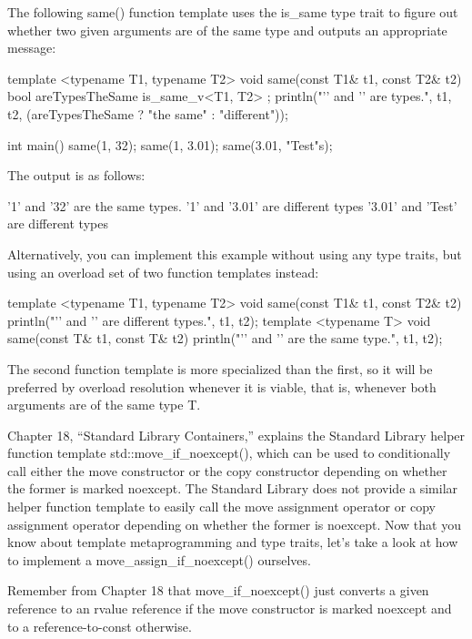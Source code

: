 The following same() function template uses the is\_same type trait to figure out whether two given arguments are of the same type and outputs an appropriate message:

\begin{cpp}
template <typename T1, typename T2>
void same(const T1& t1, const T2& t2)
{
    bool areTypesTheSame { is_same_v<T1, T2> };
    println("'{}' and '{}' are {} types.", t1, t2,
    (areTypesTheSame ? "the same" : "different"));
}

int main()
{
    same(1, 32);
    same(1, 3.01);
    same(3.01, "Test"s);
}
\end{cpp}

The output is as follows:

\begin{shell}
'1' and '32' are the same types.
'1' and '3.01' are different types
'3.01' and 'Test' are different types
\end{shell}

Alternatively, you can implement this example without using any type traits, but using an overload set of two function templates instead:

\begin{cpp}
template <typename T1, typename T2>
void same(const T1& t1, const T2& t2)
{
    println("'{}' and '{}' are different types.", t1, t2);
}
template <typename T>
void same(const T& t1, const T& t2)
{
    println("'{}' and '{}' are the same type.", t1, t2);
}
\end{cpp}

The second function template is more specialized than the first, so it will be preferred by overload resolution whenever it is viable, that is, whenever both arguments are of the same type T.


Chapter 18, “Standard Library Containers,” explains the Standard Library helper function template std::move\_if\_noexcept(), which can be used to conditionally call either the move constructor or the copy constructor depending on whether the former is marked noexcept. The Standard Library does not provide a similar helper function template to easily call the move assignment operator or copy assignment operator depending on whether the former is noexcept. Now that you know about template metaprogramming and type traits, let’s take a look at how to implement a move\_assign\_if\_noexcept() ourselves.

Remember from Chapter 18 that move\_if\_noexcept() just converts a given reference to an rvalue reference if the move constructor is marked noexcept and to a reference-to-const otherwise.

